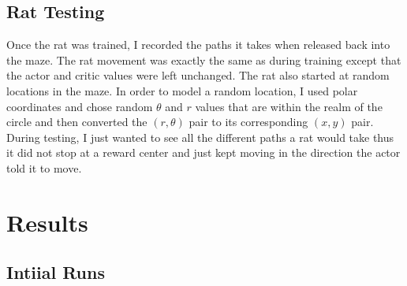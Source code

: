 \documentclass[conference]{IEEEtran}
\begin{document}
\subsection{Rat Testing}

Once the rat was trained, I recorded the paths it takes when released back into the maze. The rat movement was exactly the same as during training except that the actor and critic values were left unchanged. The rat also started at random locations in the maze. In order to model a random location, I used polar coordinates and chose random $\theta$ and $r$ values that are within the realm of the circle and then converted the $(r,\theta)$ pair to its corresponding $(x,y)$ pair. During testing, I just wanted to see all the different paths a rat would take thus it did not stop at a reward center and just kept moving in the direction the actor told it to move.

\section{Results}

\subsection{Intiial Runs}
\end{document}
